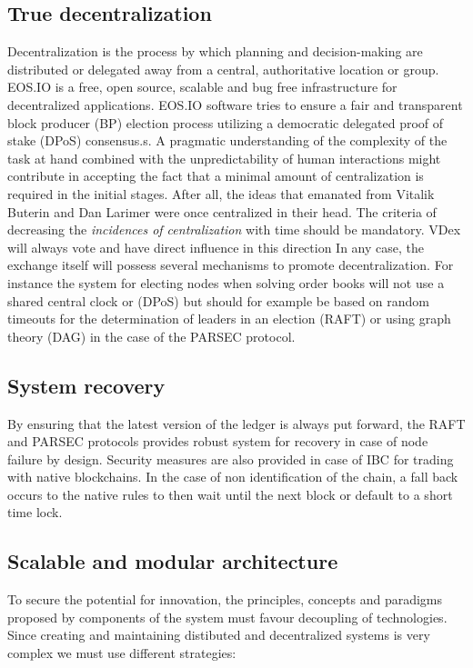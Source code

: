 \documentclass[]{article}
\begin{document}
	\subsection{True decentralization}
	 Decentralization is the process by which planning and decision-making are distributed or delegated away from a central, authoritative location or group.
	 EOS.IO is a free, open source, scalable and bug free infrastructure for decentralized applications. EOS.IO software tries to ensure a fair and transparent block producer (BP) election process utilizing a democratic delegated proof of stake (DPoS) consensus.s.
	 A pragmatic understanding of the complexity of the task at hand combined with the unpredictability of human interactions might contribute in accepting the fact that a minimal amount of centralization is required in the initial stages.
	 After all, the ideas that emanated from Vitalik Buterin and Dan Larimer were once centralized in their head. The criteria of decreasing the \textit{incidences of centralization} with time should be mandatory. VDex will always vote and have direct influence in this direction  
	 In any case, the exchange itself will possess several mechanisms to promote decentralization. For instance the system for electing nodes when solving order books will not use a shared central clock or (DPoS) but should for example be based on random timeouts for the determination of leaders in an election (RAFT) or using graph theory (DAG) in the case of the PARSEC protocol.
	 
	\subsection{System recovery}
	By ensuring that the latest version of the ledger is always put forward, 
	the RAFT and PARSEC protocols provides robust system for recovery in case of node failure by design.
	Security measures are also provided in case of IBC for trading with native blockchains. In the case of non identification of the chain, a fall back occurs to the native rules to then  wait until the next block or default to a short time lock.
	
	\subsection{Scalable and modular architecture}
	To secure the potential for innovation, the principles, 
	concepts and paradigms proposed by components of the system
	must favour decoupling of technologies. 
	Since creating and maintaining distibuted and decentralized systems
	is very complex we must use different strategies: 
\end{document}
